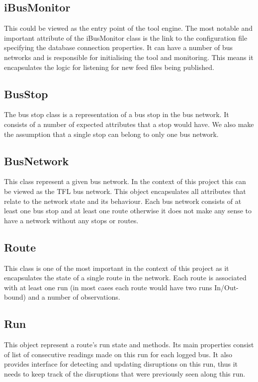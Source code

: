 \subsection{iBusMonitor}
This could be viewed as the entry point of the tool engine. The most notable and important attribute of the iBusMonitor class is the link to the configuration file specifying the database connection properties. It can have a number of bus networks and is responsible for initialising the tool and monitoring. This means it encapsulates the logic for listening for new feed files being published.

\subsection{BusStop}
The bus stop class is a representation of a bus stop in the bus network. It consists of a number of expected attributes that a stop would have. We also make the assumption that a single stop can belong to only one bus network.

\subsection{BusNetwork}
This class represent a given bus network. In the context of this project this can be viewed as the TFL bus network. This object encapsulates all attributes that relate to the network state and its behaviour. Each bus network consists of at least one bus stop and at least one route otherwise it does not make any sense to have a network without any stops or routes.

\subsection{Route}
This class is one of the most important in the context of this project as it encapsulates the state of a single route in the network. Each route is associated with at least one run (in most cases each route would have two runs In/Out-bound) and a number of observations. 

\subsection{Run}
This object represent a route's run state and methods. Its main properties consist of list of consecutive readings made on this run for each logged bus. It also provides interface for detecting and updating disruptions on this run, thus it needs to keep track of the disruptions that were previously seen along this run.

